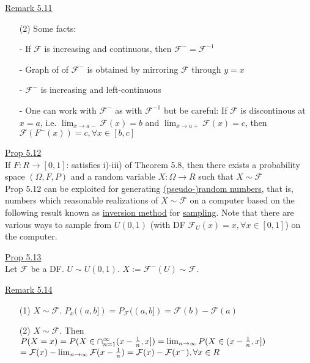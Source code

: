 \documentclass[10pt,letterpaper]{article}
\begin{document}
\underline{Remark 5.11}\\

\begin{enumerate}

\item[(2)] Some facts:
  \item[-] If $\mathcal{F}$ is increasing and continuous, then $\mathcal{F}^-=\mathcal{F}^{-1}$
  \item[-] Graph of of $\mathcal{F}^-$ is obtained by mirroring $\mathcal{F}$ through $y=x$
  \item[-] $\mathcal{F}^-$ is increasing and left-continuous
  \item[-] One can work with $\mathcal{F}^-$ as with $\mathcal{F}^{-1}$ but be careful: If $\mathcal{F}$ is discontinous at $x=a$, i.e. $\lim_{x\rightarrow a-}\mathcal{F}(x)=b$ and $\lim_{x\rightarrow a+}\mathcal{F}(x)=c$, then $\mathcal{F}(F^-(x))=c,\forall x\in [b, c]$

\end{enumerate}

\underline{Prop 5.12}\\

If $F:R\rightarrow [0,1]$: satisfies i)-iii) of Theorem 5.8, then there exists a probability space $(\Omega, F, P)$ and a random variable $X:\Omega\rightarrow R$ such that $X\sim\mathcal{F}$\\

Prop 5.12 can be exploited for generating \underline{(pseudo-)random numbers}, that is, numbers which reasonable realizations of $X\sim\mathcal{F}$ on a computer based on the following result known as \underline{inversion method} for \underline{sampling}. Note that there are various ways to sample from $U(0,1)$ (with DF $\mathcal{F}_U(x)=x, \forall x\in [0,1]$) on the computer.\\

\pagebreak

\underline{Prop 5.13}\\

Let $\mathcal{F}$ be a DF. $U\sim U(0,1)$. $X:=\mathcal{F}^-(U)\sim\mathcal{F}$.

\underline{Remark 5.14}\\

\begin{enumerate}

\item[(1)] $X\sim\mathcal{F}$. $P_x((a,b])=P_{\mathcal{F}}((a,b])=\mathcal{F}(b)-\mathcal{F}(a)$

\item[(2)] $X\sim\mathcal{F}$. Then $P(X=x)=P(X\in\cap_{n=1}^{\infty}(x-\frac{1}{n},x])\\=\lim_{n\rightarrow\infty}P(X\in(x-\frac{1}{n},x])$\\$=\mathcal{F}(x)-\lim_{n\rightarrow\infty}\mathcal{F}(x-\frac{1}{n})\\=\mathcal{F}(x)-\mathcal{F}(x^-),\forall x\in R$

\end{enumerate}
\end{document}
